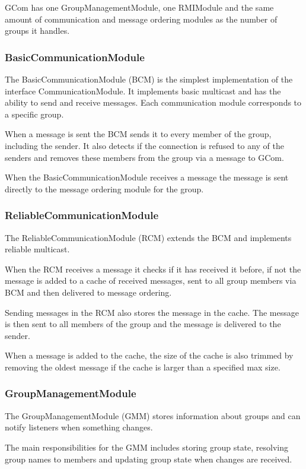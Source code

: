 \documentclass[english]{article}
\begin{document}
GCom has one GroupManagementModule, one RMIModule and the same amount of communication and message ordering modules as the number of groups it handles.

\subsubsection{BasicCommunicationModule}
The BasicCommunicationModule (BCM) is the simplest implementation of the interface CommunicationModule. It implements basic multicast and has the ability to send and receive messages. Each communication module corresponds to a specific group. 

When a message is sent the BCM sends it to every member of the group, including the sender. It also detects if the connection is refused to any of the senders and removes these members from the group via a message to GCom.

When the BasicCommunicationModule receives a message the message is sent directly to the message ordering module for the group.

\subsubsection{ReliableCommunicationModule}
The ReliableCommunicationModule (RCM) extends the BCM and implements reliable multicast.

When the RCM receives a message it checks if it has received it before, if not the message is added to a cache of received messages, sent to all group members via BCM and then delivered to message ordering.

Sending messages in the RCM also stores the message in the cache. The message is then sent to all members of the group and the message is delivered to the sender.

When a message is added to the cache, the size of the cache is also trimmed by removing the oldest message if the cache is larger than a specified max size.

\subsubsection{GroupManagementModule}
The GroupManagementModule (GMM) stores information about groups and can notify listeners when something changes.

The main responsibilities for the GMM includes storing group state, resolving group names to members and updating group state when changes are received.
\end{document}
